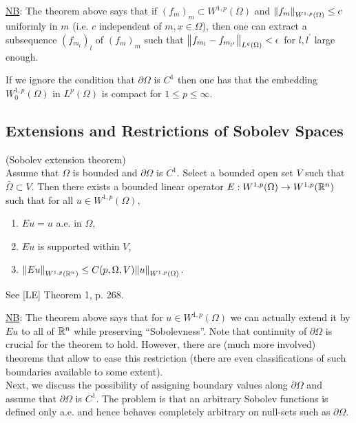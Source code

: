 \documentclass[11pt]{article}
\begin{document}
    		\noindent\underline{NB}: The theorem above says that if $(f_m)_m\subset W^{1,p}(\Omega)$ and $\norm{f_m}_{W^{1,p}(\Omega)}\le c$ uniformly in $m$ (i.e. $c$ independent of $m,x\in\Omega$), then one can extract a subsequence $(f_{m_l})_l$ of $(f_m)_m$ such that $\norm{f_{m_l}-f_{m_{l^\prime}}}_{L^q(\Omega)}<\epsilon$ for $l,l^\prime$ large enough.
    
    		\begin{remark}
    			If we ignore the condition that $\partial\Omega$ is $C^1$ then one has that the embedding $W^{1,p}_0(\Omega)$ in $L^p(\Omega)$ is compact for $1\le p\le\infty$.
    		\end{remark}


    	\subsection{Extensions and Restrictions of Sobolev Spaces}
    
    		\begin{thm}
    			(Sobolev extension theorem)\\
    			Assume that $\Omega$ is bounded and $\partial\Omega$ is $C^1$. Select a bounded open set $V$ such that $\bar{\Omega}\subset V$. Then there exists a bounded linear operator $E:W^{1,p}(\Omega)\rightarrow W^{1,p}(\mathbb{R}^n)$ such that for all $u\in W^{1,p}(\Omega)$,
    			\begin{enumerate}
    				\item $Eu=u$ a.e. in $\Omega$,
    				\item $Eu$ is supported within $V$,
    				\item $\norm{Eu}_{W^{1,p}(\mathbb{R}^n)}\le C(p,\Omega,V)\norm{u}_{W^{1,p}(\Omega)}$.
    			\end{enumerate}
    		\end{thm}
    		\begin{pproof}
    			See [LE] Theorem 1, p. 268.
    		\end{pproof}
    
    		\noindent\underline{NB}: The theorem above says that for $u\in W^{1,p}(\Omega)$ we can actually extend it by $Eu$ to all of $\mathbb{R}^n$ while preserving ``Sobolevness''. Note that continuity of $\partial\Omega$ is crucial for the theorem to hold. However, there are (much more involved) theorems that allow to ease this restriction (there are even classifications of such boundaries available to some extent).
    		\\
    
    		Next, we discuss the possibility of assigning boundary values along $\partial\Omega$ and assume that $\partial\Omega$ is $C^1$. The problem is that an arbitrary Sobolev functions is defined only a.e. and hence behaves completely arbitrary on null-sets such as $\partial\Omega$.
    
\end{document}
